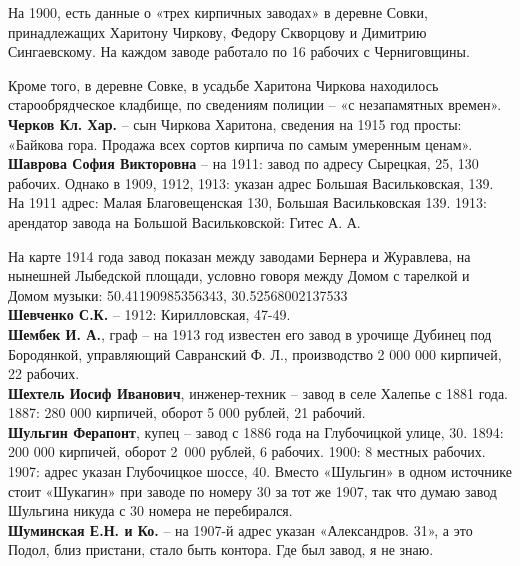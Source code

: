 На 1900, есть данные о «трех кирпичных заводах» в деревне Совки, принадлежащих Харитону Чиркову, Федору Скворцову и Димитрию Сингаевскому. На каждом заводе работало по 16 рабочих с Черниговщины.

Кроме того, в деревне Совке, в усадьбе Харитона Чиркова находилось старообрядческое кладбище, по сведениям полиции – «с незапамятных времен».\\

\noindent\textbf{Черков Кл. Хар.} – сын Чиркова Харитона, сведения на 1915 год просты: «Байкова гора. Продажа всех сортов кирпича по самым умеренным ценам».\\

\noindent\textbf{Шаврова София Викторовна} – на 1911: завод по адресу Сырецкая, 25, 130 рабочих. Однако в 1909, 1912, 1913: указан адрес Большая Васильковская, 139. На 1911 адрес: Малая Благовещенская 130, Большая Васильковская 139. 1913: арендатор завода на Большой Васильковской: Гитес А. А.

На карте 1914 года завод показан между заводами Бернера и Журавлева, на нынешней Лыбедской площади, условно говоря между Домом с тарелкой и Домом музыки: 50.41190985356343, 30.52568002137533\\

\noindent\textbf{Шевченко С.К.} – 1912: Кирилловская, 47-49.\\ 

\noindent\textbf{Шембек И. А.}, граф – на 1913 год известен его завод в урочище Дубинец под Бородянкой, управляющий Савранский Ф. Л., производство 2 000 000 кирпичей, 22 рабочих.\\

\noindent\textbf{Шехтель Иосиф Иванович}, инженер-техник – завод в селе Халепье с 1881 года. 1887: 280 000 кирпичей, оборот 5 000 рублей, 21 рабочий.\\

\noindent\textbf{Шульгин Ферапонт}, купец – завод с 1886 года на Глубочицкой улице, 30. 1894: 200 000 кирпичей, оборот \mbox{2 000} рублей, 6 рабочих. 1900: 8 местных рабочих. 1907: адрес указан Глубочицкое шоссе, 40. Вместо «Шульгин» в одном источнике стоит «Шукагин» при заводе по номеру 30 за тот же 1907, так что думаю завод Шульгина никуда с 30 номера не перебирался.\\

\noindent\textbf{Шуминская Е.Н. и Ко.} – на 1907-й адрес указан «Александров. 31», а это Подол, близ пристани, стало быть контора. Где был завод, я не знаю.\\

